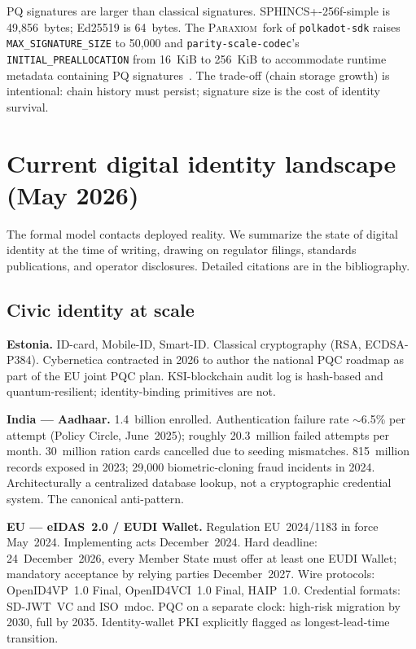 \documentclass[11pt,a4paper,parskip=half-,DIV=12,headings=standardclasses]{scrartcl}
\theoremstyle{ncthm}
\theoremstyle{ncdef}
\newcommand{\paraxiom}{\textsc{Paraxiom}}
\begin{document}
PQ signatures are larger than classical signatures. SPHINCS+-256f-simple
is 49{,}856~bytes; Ed25519 is 64~bytes. The \paraxiom\ fork of
\texttt{polkadot-sdk} raises \texttt{MAX\_SIGNATURE\_SIZE} to 50{,}000
and \texttt{parity-scale-codec}'s
\texttt{INITIAL\_PREALLOCATION} from 16~KiB to 256~KiB to accommodate
runtime metadata containing PQ signatures~\cite{paraxiom-mods-manifest}.
The trade-off (chain storage growth) is intentional: chain history
must persist; signature size is the cost of identity survival.

\section{Current digital identity landscape (May 2026)}\label{sec:landscape}

The formal model contacts deployed reality. We summarize the state of
digital identity at the time of writing, drawing on regulator filings,
standards publications, and operator disclosures. Detailed citations
are in the bibliography.

\subsection{Civic identity at scale}

\textbf{Estonia.} ID-card, Mobile-ID, Smart-ID. Classical cryptography
(RSA, ECDSA-P384). Cybernetica contracted in 2026 to author the
national PQC roadmap as part of the EU joint PQC plan. KSI-blockchain
audit log is hash-based and quantum-resilient; identity-binding
primitives are not.

\textbf{India --- Aadhaar.} 1.4~billion enrolled. Authentication
failure rate $\sim$6.5\% per attempt (Policy Circle, June~2025);
roughly 20.3~million failed attempts per month. 30~million ration
cards cancelled due to seeding mismatches. 815~million records
exposed in 2023; 29{,}000 biometric-cloning fraud incidents in 2024.
Architecturally a centralized database lookup, not a cryptographic
credential system. The canonical anti-pattern.

\textbf{EU --- eIDAS~2.0 / EUDI Wallet.} Regulation EU~2024/1183 in
force May~2024. Implementing acts December~2024. Hard deadline:
24~December~2026, every Member State must offer at least one EUDI
Wallet; mandatory acceptance by relying parties December~2027. Wire
protocols: OpenID4VP~1.0 Final, OpenID4VCI~1.0 Final, HAIP~1.0.
Credential formats: SD-JWT~VC and ISO~mdoc. PQC on a separate clock:
high-risk migration by 2030, full by 2035. Identity-wallet PKI
explicitly flagged as longest-lead-time transition.
\end{document}
